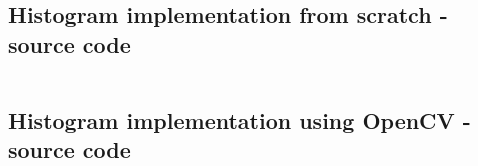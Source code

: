 \documentclass[a4paper]{article}
\begin{document}
\newpage
\subsection{Histogram implementation from scratch - source code}
\label{app:hist_backproj_src}
\inputminted{python}{src/hist_backproj/backproj.py}



\newpage
\subsection{Histogram implementation using OpenCV - source code}
\label{app:hist_backproj_src_opencv}
\inputminted{python}{src/hist_backproj/backproj_cv.py}
\end{document}
